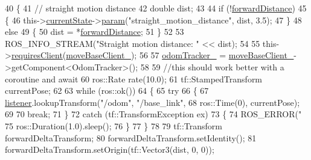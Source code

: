 \begin{DoxyCode}
40     \{
41         \textcolor{comment}{// straight motion distance}
42         \textcolor{keywordtype}{double} dist;
43 
44         \textcolor{keywordflow}{if} (!\hyperlink{classsm__dance__bot_1_1move__base__z__client_1_1CbNavigateForward_a2c1a04f86c3a0c40d516654fa0b4944a}{forwardDistance})
45         \{
46             this->\hyperlink{classsmacc_1_1SmaccClientBehavior_af76fc9b877542ed5caf033f820c107d0}{currentState}->\hyperlink{classsmacc_1_1ISmaccState_a4982f2187ed6da337462721146e8ef70}{param}(\textcolor{stringliteral}{"straight\_motion\_distance"}, dist, 3.5);
47         \}
48         \textcolor{keywordflow}{else}
49         \{
50             dist = *\hyperlink{classsm__dance__bot_1_1move__base__z__client_1_1CbNavigateForward_a2c1a04f86c3a0c40d516654fa0b4944a}{forwardDistance};
51         \}
52 
53         ROS\_INFO\_STREAM(\textcolor{stringliteral}{"Straight motion distance: "} << dist);
54 
55         this->\hyperlink{classsmacc_1_1SmaccClientBehavior_a917f001e763a1059af337bf4e164f542}{requiresClient}(\hyperlink{classsm__dance__bot_1_1move__base__z__client_1_1CbNavigateForward_a75d6a72a4ac20fb718723fc9f98efae2}{moveBaseClient\_});
56 
57         \hyperlink{classsm__dance__bot_1_1move__base__z__client_1_1CbNavigateForward_ad383206447b313d604e6645041a6cfc4}{odomTracker\_} = \hyperlink{classsm__dance__bot_1_1move__base__z__client_1_1CbNavigateForward_a75d6a72a4ac20fb718723fc9f98efae2}{moveBaseClient\_}->getComponent<OdomTracker>();
58 
59         \textcolor{comment}{//this should work better with a coroutine and await}
60         ros::Rate rate(10.0);
61         tf::StampedTransform currentPose;
62 
63         \textcolor{keywordflow}{while} (ros::ok())
64         \{
65             \textcolor{keywordflow}{try}
66             \{
67                 \hyperlink{classsm__dance__bot_1_1move__base__z__client_1_1CbNavigateForward_ada990a8520ff4e8e4051e7043958c636}{listener}.lookupTransform(\textcolor{stringliteral}{"/odom"}, \textcolor{stringliteral}{"/base\_link"},
68                                          ros::Time(0), currentPose);
69 
70                 \textcolor{keywordflow}{break};
71             \}
72             \textcolor{keywordflow}{catch} (tf::TransformException ex)
73             \{
74                 ROS\_ERROR(\textcolor{stringliteral}{"%
75                 ros::Duration(1.0).sleep();
76             \}
77         \}
78 
79         tf::Transform forwardDeltaTransform;
80         forwardDeltaTransform.setIdentity();
81         forwardDeltaTransform.setOrigin(tf::Vector3(dist, 0, 0));
}
\end{DoxyCode}
